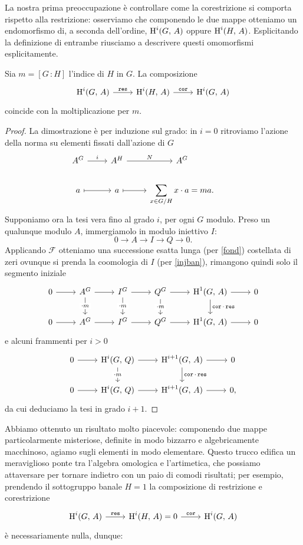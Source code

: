 La nostra prima preoccupazione è controllare come la corestrizione si comporta rispetto alla restrizione: osserviamo che componendo le due mappe otteniamo un endomorfismo di, a seconda dell'ordine, $ \operatorname{H}^i(G, \, A) $ oppure $ \operatorname{H}^i(H, \, A) $. Esplicitando la definizione di entrambe riusciamo a descrivere questi omomorfismi esplicitamente.

\begin{theorem}
	Sia $ m = [G \,\colon H] $ l'indice di $ H $ in $ G $. La composizione
	\[\begin{tikzcd}
	\HH^i(G, \, A) \rar["\Res"] & \HH^i(H, \, A) \rar["\Cor"] & \HH^i(G, \, A)
	\end{tikzcd}  \]
	coincide con la moltiplicazione per $ m $.
\end{theorem}
\begin{proof}
	La dimostrazione è per induzione sul grado: in $ i = 0 $ ritroviamo l'azione della norma su elementi fissati dall'azione di $ G $
	\[\begin{tikzcd}
	A^G \rar["i"] & A^H \rar["N"] & A^G & \\
	a \rar[mapsto] & a \rar[mapsto] & \displaystyle\sum_{x \in G/H} x \cdot a = ma.
	\end{tikzcd}  \]
	Supponiamo ora la tesi vera fino al grado $ i $, per ogni $ G $ modulo. Preso un qualunque modulo $ A $, immergiamolo in modulo iniettivo $ I $:
	\[ 0 \to A \to I \to Q \to 0. \]
	Applicando $ \mathcal{F} $ otteniamo una successione esatta lunga (per \ref{fond}) costellata di zeri ovunque si prenda la coomologia di $ I $ (per \ref{injban}), rimangono quindi solo il segmento iniziale
	\[\begin{tikzcd}
	0 \rar
	& A^G \rar\dar["\cdot m" description]
	& I^G \rar\dar["\cdot m" description] 
	& Q^G \rar\dar["\cdot m" description] 
	& \HH^1(G, \, A) \rar\dar["\Cor \cdot \Res"] 
	& 0 \\
	0 \rar 
	& A^G \rar 
	& I^G \rar 
	& Q^G \rar 
	& \HH^1(G, \, A) \rar 
	& 0
	\end{tikzcd}\]
	e alcuni frammenti per $ i > 0 $
	\[\begin{tikzcd}
	0 \rar & \HH^i(G, \, Q) \rar\dar["\cdot m" description] & \HH^{i+1}(G, \, A) \rar\dar["\Cor \cdot \Res"] & 0 \\
	0 \rar & \HH^i(G, \, Q) \rar & \HH^{i+1}(G, \, A) \rar & 0,
	\end{tikzcd}\]
	da cui deduciamo la tesi in grado $ i+1 $.
\end{proof}

Abbiamo ottenuto un risultato molto piacevole: componendo due mappe particolarmente misteriose, definite in modo bizzarro e algebricamente macchinoso, agiamo sugli elementi in modo elementare. Questo trucco edifica un meraviglioso ponte tra l'algebra omologica e l'artimetica, che possiamo attaversare per tornare indietro con un paio di comodi risultati; per esempio, prendendo il sottogruppo banale $ H = 1 $ la composizione di restrizione e corestrizione
\[\begin{tikzcd}
\HH^i(G, \, A) \rar["\Res"] & \HH^i(H, \, A) = 0 \rar["\Cor"] & \HH^i(G, \, A)
\end{tikzcd}  \]
è necessariamente nulla, dunque:


